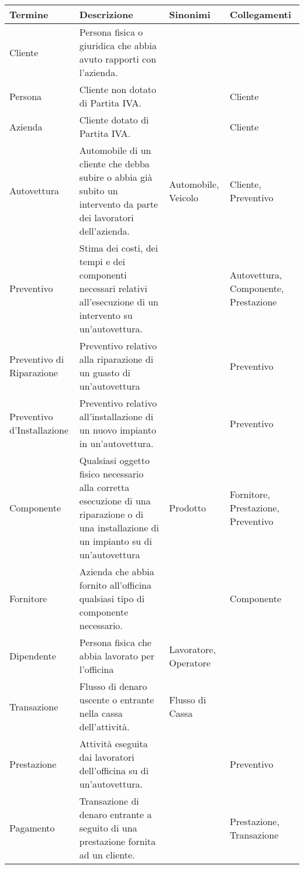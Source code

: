 		\begin{longtable}{| p{2.5cm} | p{4.5cm} | p{2cm} | p{2.5cm} |}
				
			\hline
				Termine & Descrizione & Sinonimi & Collegamenti \\ 
				\hline
				Cliente & 
				Persona fisica o giuridica che abbia avuto rapporti con l'azienda.
				&&\\ \hline
				Persona &
				Cliente non dotato di Partita IVA. & &
				Cliente
				\\ \hline
				Azienda &
				Cliente dotato di Partita IVA. & &
				Cliente
				\\ \hline
				Autovettura &
				Automobile di un cliente che debba subire o abbia già subito un intervento da parte dei lavoratori dell’azienda. &
				Automobile, Veicolo &
				Cliente, Preventivo
				\\ \hline
				Preventivo &
				Stima dei costi, dei tempi e dei componenti necessari relativi all’esecuzione di un intervento su un’autovettura. & &
				Autovettura, Componente, Prestazione
				\\ \hline
				Preventivo di Riparazione &
				Preventivo relativo alla riparazione di un guasto di un’autovettura & &
				Preventivo 
				\\ \hline
				Preventivo d'Installazione & 
				Preventivo relativo all’installazione di un nuovo impianto in un’autovettura. & &
				Preventivo
				\\ \hline
				Componente &
				Qualsiasi oggetto fisico necessario alla corretta esecuzione di una riparazione o di una installazione di un impianto su di un’autovettura &
				Prodotto & 
				Fornitore, Prestazione, Preventivo
				\\ \hline
				Fornitore & 
				Azienda che abbia fornito all’officina qualsiasi tipo di componente necessario. & &
				Componente
				\\ \hline
				Dipendente & 
				Persona fisica che abbia lavorato per l’officina &
				Lavoratore, Operatore &
				\\ \hline
				Transazione &
				Flusso di denaro uscente o entrante nella cassa dell’attività. &
				Flusso di Cassa &
				\\ \hline
				Prestazione &
				Attività eseguita dai lavoratori dell’officina su di un’autovettura. & &
				Preventivo
				\\ \hline
				Pagamento &
				Transazione di denaro entrante a seguito di una prestazione fornita ad un cliente. &&
				Prestazione, Transazione
				\\ \hline

\end{longtable}
